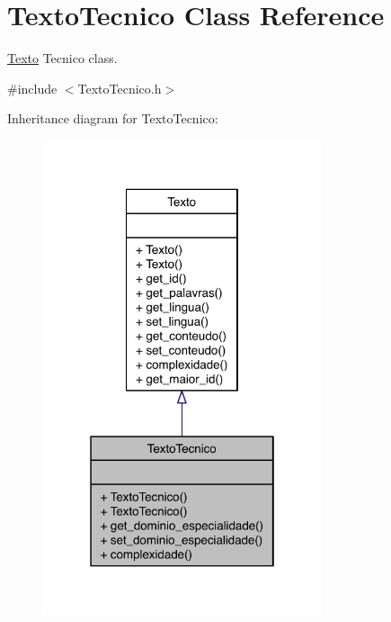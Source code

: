 \hypertarget{class_texto_tecnico}{\section{Texto\-Tecnico Class Reference}
\label{class_texto_tecnico}
}


\hyperlink{class_texto}{Texto} Tecnico class.  




{\ttfamily \#include $<$Texto\-Tecnico.\-h$>$}



Inheritance diagram for Texto\-Tecnico\-:
\nopagebreak
\begin{figure}[H]
\begin{center}
\leavevmode
\includegraphics[width=232pt]{class_texto_tecnico__inherit__graph}
\end{center}
\end{figure}


